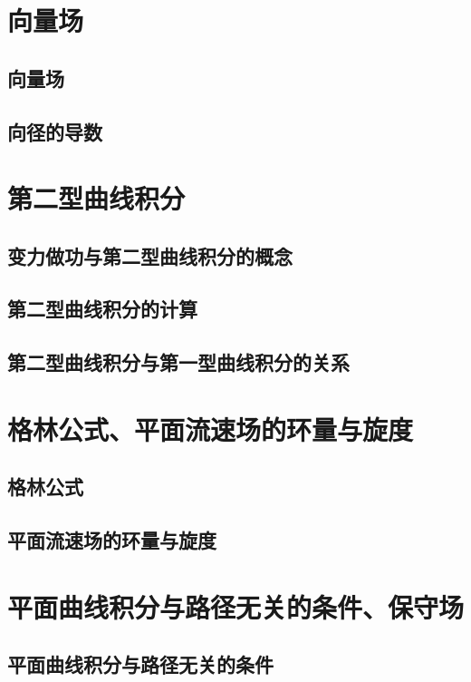 
\section{向量场}
\subsection{向量场}

\subsection{向径的导数}

\section{第二型曲线积分}
\subsection{变力做功与第二型曲线积分的概念}

\subsection{第二型曲线积分的计算}

\subsection{第二型曲线积分与第一型曲线积分的关系}

\section{格林公式、平面流速场的环量与旋度}
\subsection{格林公式}

\subsection{平面流速场的环量与旋度}

\section{平面曲线积分与路径无关的条件、保守场}
\subsection{平面曲线积分与路径无关的条件}

